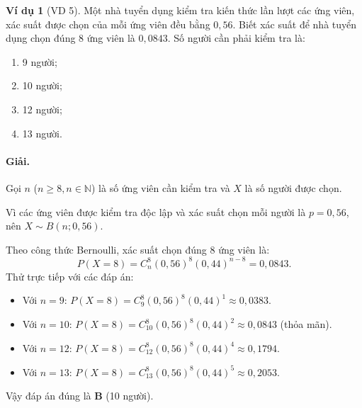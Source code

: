 \documentclass[12pt,a4paper]{article}
\theoremstyle{definition}
\newtheorem{vidu}{Ví dụ}[section]
\begin{document}
\begin{vidu}[VD 5]
Một nhà tuyển dụng kiểm tra kiến thức lần lượt các ứng viên, xác suất được chọn của mỗi ứng viên đều bằng $0{,}56$. Biết xác suất để nhà tuyển dụng chọn đúng 8 ứng viên là $0{,}0843$. Số người cần phải kiểm tra là:
\begin{enumerate}[label=\Alph*.]
    \item 9 người;
    \item 10 người;
    \item 12 người;
    \item 13 người.
\end{enumerate}

\paragraph{Giải.}
Gọi $n$ ($n \ge 8, n \in \mathbb{N}$) là số ứng viên cần kiểm tra và $X$ là số người được chọn.

Vì các ứng viên được kiểm tra độc lập và xác suất chọn mỗi người là $p = 0{,}56$, nên $X \sim B(n; 0{,}56)$.

Theo công thức Bernoulli, xác suất chọn đúng 8 ứng viên là:
\[
P(X = 8) = C_n^8 (0{,}56)^8 (0{,}44)^{n - 8} = 0{,}0843.
\]
Thử trực tiếp với các đáp án:
\begin{itemize}
    \item Với $n = 9$: $P(X = 8) = C_9^8 (0{,}56)^8 (0{,}44)^1 \approx 0{,}0383$.
    \item Với $n = 10$: $P(X = 8) = C_{10}^8 (0{,}56)^8 (0{,}44)^2 \approx 0{,}0843$ (thỏa mãn).
    \item Với $n = 12$: $P(X = 8) = C_{12}^8 (0{,}56)^8 (0{,}44)^4 \approx 0{,}1794$.
    \item Với $n = 13$: $P(X = 8) = C_{13}^8 (0{,}56)^8 (0{,}44)^5 \approx 0{,}2053$.
\end{itemize}
Vậy đáp án đúng là \textbf{B} (10 người).
\end{vidu}
\end{document}
